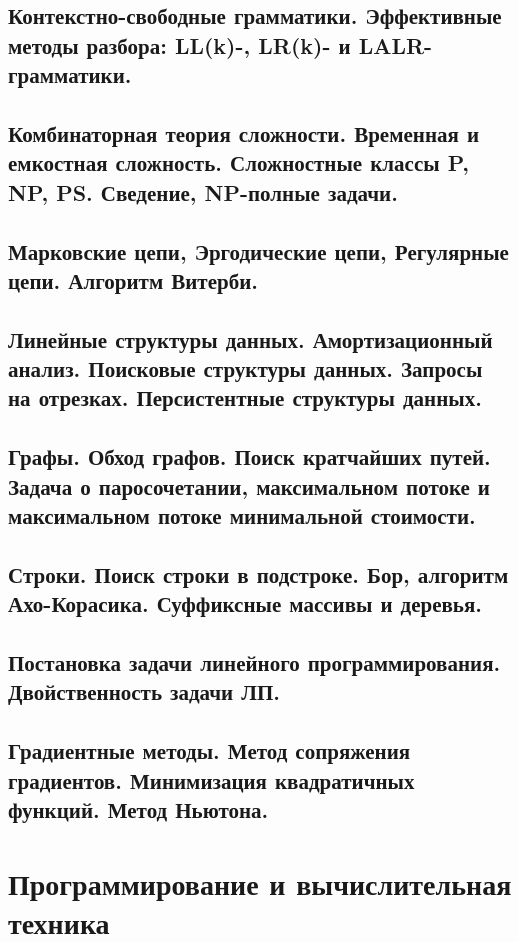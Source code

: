 \documentclass{article}
\begin{document}
	\subsection{Контекстно-свободные грамматики. Эффективные методы разбора: LL(k)-, LR(k)- и LALR-грамматики.}
	
	\subsection{Комбинаторная теория сложности. Временная и емкостная сложность. Сложностные классы P, NP, PS. Сведение, NP-полные задачи.}
	
	\subsection{Марковские цепи, Эргодические цепи, Регулярные цепи. Алгоритм Витерби.}
	
	\subsection{Линейные структуры данных. Амортизационный анализ. Поисковые структуры данных. Запросы на отрезках. Персистентные структуры данных.}
	
	\subsection{Графы. Обход графов. Поиск кратчайших путей. Задача о паросочетании, максимальном потоке и максимальном потоке минимальной стоимости.}
	
	\subsection{Строки. Поиск строки в подстроке. Бор, алгоритм Ахо-Корасика. Суффиксные массивы и деревья.}
	
	\subsection{Постановка задачи линейного программирования. Двойственность задачи ЛП.}
	
	\subsection{Градиентные методы. Метод сопряжения градиентов. Минимизация квадратичных функций. Метод Ньютона.}
	
	\newpage
	
	\section{Программирование и вычислительная техника}
	
\end{document}
